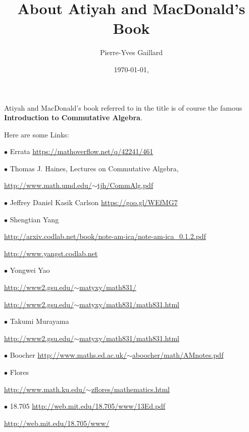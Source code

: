 \documentclass[12pt]{article}
\title{About Atiyah and MacDonald's Book}
\author{Pierre-Yves Gaillard}
\date{\today,\currenttime}
\newcommand{\bu}{\bullet}
\begin{document}


\maketitle\tableofcontents

Atiyah and MacDonald's book referred to in the title is of course the famous \textbf{Introduction to Commutative Algebra}.

Here are some Links:

$\bu$ Errata \href{https://mathoverflow.net/q/42241/461}{https://mathoverflow.net/q/42241/461}

$\bu$ Thomas J. Haines, Lectures on Commutative Algebra, 

\href{http://www.math.umd.edu/~tjh/CommAlg.pdf}{http://www.math.umd.edu/$\sim$tjh/CommAlg.pdf}

$\bu$ Jeffrey Daniel Kasik Carlson \href{https://goo.gl/WEfMG7}{https://goo.gl/WEfMG7}

$\bu$ Shengtian Yang 

\href{http://arxiv.codlab.net/book/note-am-ica/note-am-ica_0.1.2.pdf}{\small http://arxiv.codlab.net/book/note-am-ica/note-am-ica\_0.1.2.pdf}

\href{http://www.yangst.codlab.net}{http://www.yangst.codlab.net}

$\bu$ Yongwei Yao

\href{http://www2.gsu.edu/~matyxy/math831/}{http://www2.gsu.edu/$\sim$matyxy/math831/}

\href{http://www2.gsu.edu/~matyxy/math831/math831.html}{http://www2.gsu.edu/$\sim$matyxy/math831/math831.html}

$\bu$ Takumi Murayama 

\href{http://www2.gsu.edu/~matyxy/math831/math831.html}{http://www2.gsu.edu/$\sim$matyxy/math831/math831.html}

$\bu$ Boocher \href{http://www.maths.ed.ac.uk/~aboocher/math/AMnotes.pdf}{\small http://www.maths.ed.ac.uk/$\sim$aboocher/math/AMnotes.pdf}

$\bu$ Flores 

\href{http://www.math.ku.edu/~zflores/mathematics.html}{http://www.math.ku.edu/$\sim$zflores/mathematics.html}

$\bu$ 18.705 \href{http://web.mit.edu/18.705/www/13Ed.pdf}{http://web.mit.edu/18.705/www/13Ed.pdf}

\href{http://web.mit.edu/18.705/www/}{http://web.mit.edu/18.705/www/}
\end{document}
